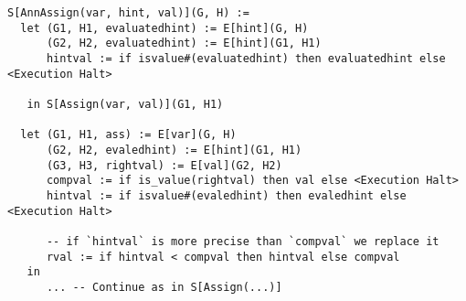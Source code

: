 \begin{verbatim}
S[AnnAssign(var, hint, val)](G, H) :=
  let (G1, H1, evaluatedhint) := E[hint](G, H)
      (G2, H2, evaluatedhint) := E[hint](G1, H1)
      hintval := if isvalue#(evaluatedhint) then evaluatedhint else <Execution Halt>

   in S[Assign(var, val)](G1, H1)

  let (G1, H1, ass) := E[var](G, H)
      (G2, H2, evaledhint) := E[hint](G1, H1)
      (G3, H3, rightval) := E[val](G2, H2)
      compval := if is_value(rightval) then val else <Execution Halt>
      hintval := if isvalue#(evaledhint) then evaledhint else <Execution Halt>

      -- if `hintval` is more precise than `compval` we replace it
      rval := if hintval < compval then hintval else compval
   in
      ... -- Continue as in S[Assign(...)]
\end{verbatim}
